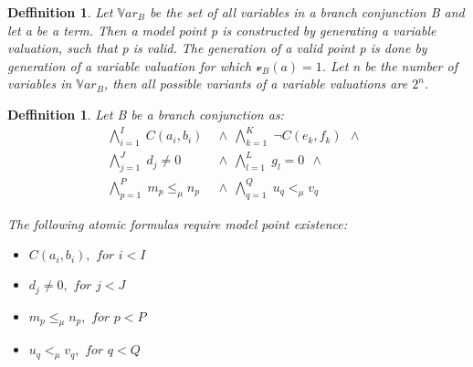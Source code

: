 \documentclass{article}
\newtheorem{defn}[theorem]{Deffinition}
\newcommand{\Var}{\mathbb{V}ar}
\newcommand{\vBool}{\mathscr{v}_B}
\newcommand{\BranchConjunction}{%
\begin{align*}
			\bigwedge_{i=1}^{I} \; C(a_i, b_i) \:\: & \wedge \:\: 
			\bigwedge_{k=1}^{K} \; \neg C(e_k, f_k) \:\: \wedge \:\: \\
			\bigwedge_{j=1}^{J} \; d_j \neq 0 \:\: & \wedge \:\:
			\bigwedge_{l=1}^{L} \; g_l = 0 \:\: \wedge \:\:\\
			\bigwedge_{p=1}^{P} \; m_p \le_\mu n_p \:\: &\wedge \:\:
			\bigwedge_{q=1}^{Q} \; u_q <_\mu v_q \:\:
\end{align*}%
}
\begin{document}
	\begin{defn}
		Let $\Var_B$ be the set of all variables in a branch conjunction B and let a be a term.
		Then a model point p is constructed by generating a variable valuation, such that p is valid.
		The generation of a valid point p is done by generation of a variable valuation for which $\vBool(a) = 1$. 
		Let n be the number of variables in $\Var_B$, then all possible variants of a variable valuations are $2^n$.
	\end{defn}

	\begin{defn}
		Let B be a branch conjunction as:
		\BranchConjunction
		The following atomic formulas require model point existence:
		\begin{itemize}
			\item $C(a_i, b_i), \textit{ for } i < I$
			\item $d_j \neq 0, \textit{ for } j < J$
			\item $m_p \le_\mu n_p, \textit{ for } p < P$
			\item $u_q <_\mu v_q, \textit{ for } q < Q$
		\end{itemize}
	\end{defn}
\end{document}
